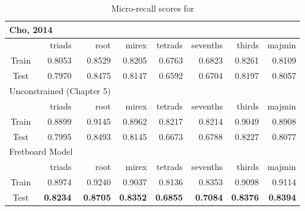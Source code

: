 \begin{table}[t]
\begin{center}
\scriptsize
\caption{Micro-recall scores for }
\label{tab:rc_agreement}
\begin{tabular}{c|rrrrrrr}

\hline
\multicolumn{3}{l}{Cho, 2014} & & & & & \\
\hline
 & triads &   root &   mirex &   tetrads &   sevenths &   thirds &   majmin \\
\hline
Train & 0.8053 & 0.8529 &  0.8205 & 0.6763 & 0.6823 & 0.8261 & 0.8109 \\
Test & 0.7970 & 0.8475 & 0.8147 & 0.6592 & 0.6704 & 0.8197 & 0.8057 \\
\hline
\hline
\multicolumn{3}{l}{Unconstrained (Chapter 5)} & & & & & \\
\hline
 & triads &   root &   mirex &   tetrads &   sevenths &   thirds &   majmin \\
\hline
Train & 0.8899 & 0.9145 & 0.8962 & 0.8217 & 0.8214 & 0.9049 & 0.8908 \\
Test  & 0.7995 & 0.8493 & 0.8145 & 0.6673 & 0.6788 & 0.8227 & 0.8077 \\
\hline
\hline
\multicolumn{3}{l}{Fretboard Model} & & & & & \\
\hline
 & triads &   root &   mirex &   tetrads &   sevenths &   thirds &   majmin \\
\hline
Train & 0.8974 & 0.9240 & 0.9037 & 0.8136 & 0.8353 & 0.9098 & 0.9114 \\
Test & \textbf{0.8234} & \textbf{0.8705} & \textbf{0.8352} & \textbf{0.6855} & \textbf{0.7084} & \textbf{0.8376} & \textbf{0.8394} \\
\hline
\end{tabular}
\end{center}
\end{table}
